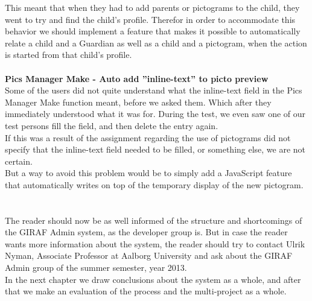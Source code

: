 This meant that when they had to add parents or pictograms to the child, they went to try and find the child's profile. Therefor in order to accommodate this behavior we should implement a feature that makes it possible to automatically relate a child and a Guardian as well as a child and a pictogram, when the action is started from that child's profile.\\
\\
\textbf{Pics Manager Make - Auto add ''inline-text'' to picto preview}\\
Some of the users did not quite understand what the inline-text field in the Pics Manager Make function meant, before we asked them. Which after they immediately understood what it was for. During the test, we even saw one of our test persons fill the field, and then delete the entry again.\\
If this was a result of the assignment regarding the use of pictograms did not specify that the inline-text field needed to be filled, or something else, we are not certain.\\
But a way to avoid this problem would be to simply add a JavaScript feature that automatically writes on top of the temporary display of the new pictogram.\\
\\
\\
The reader should now be as well informed of the structure and shortcomings of the GIRAF Admin system, as the developer group is. But in case the reader wants more information about the system, the reader should try to contact Ulrik Nyman, Associate Professor at Aalborg University and ask about the GIRAF Admin group of the summer semester, year 2013.\\
In the next chapter we draw conclusions about the system as a whole, and after that we make an evaluation of the process and the multi-project as a whole.



